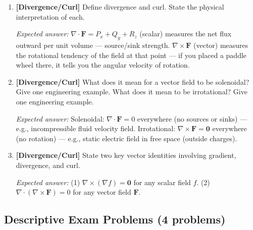 \documentclass[12pt,a4paper]{article}
\begin{document}
\begin{enumerate}[leftmargin=*, label=\textbf{Q\arabic*.}]
  \textit{Expected answer:} $z - z_0 = f_x(x_0,y_0)(x-x_0) + f_y(x_0,y_0)(y-y_0)$.

  \item \textbf{[Divergence/Curl]} Define divergence and curl. State the physical interpretation of each.

  \textit{Expected answer:} $\nabla \cdot \mathbf{F} = P_x+Q_y+R_z$ (scalar) measures the net flux outward per unit volume --- source/sink strength. $\nabla \times \mathbf{F}$ (vector) measures the rotational tendency of the field at that point --- if you placed a paddle wheel there, it tells you the angular velocity of rotation.

  \item \textbf{[Divergence/Curl]} What does it mean for a vector field to be solenoidal? Give one engineering example. What does it mean to be irrotational? Give one engineering example.

  \textit{Expected answer:} Solenoidal: $\nabla \cdot \mathbf{F} = 0$ everywhere (no sources or sinks) --- e.g., incompressible fluid velocity field. Irrotational: $\nabla \times \mathbf{F} = \mathbf{0}$ everywhere (no rotation) --- e.g., static electric field in free space (outside charges).

  \item \textbf{[Divergence/Curl]} State two key vector identities involving gradient, divergence, and curl.

  \textit{Expected answer:} (1) $\nabla \times (\nabla f) = \mathbf{0}$ for any scalar field $f$. (2) $\nabla \cdot (\nabla \times \mathbf{F}) = 0$ for any vector field $\mathbf{F}$.
\end{enumerate}

\subsection*{Descriptive Exam Problems (4 problems)}
\end{document}

